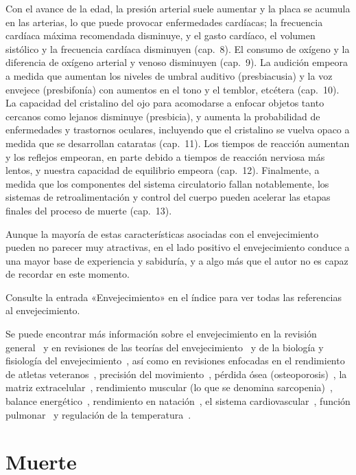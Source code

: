 \documentclass[12pt,a4paper]{book}
\begin{document}
Con el avance de la edad, la presión arterial suele aumentar y la placa se acumula en las arterias, lo que puede provocar enfermedades cardíacas; la frecuencia cardíaca máxima recomendada disminuye, y el gasto cardíaco, el volumen sistólico y la frecuencia cardíaca disminuyen (cap.~8). El consumo de oxígeno y la diferencia de oxígeno arterial y venoso disminuyen (cap.~9). La audición empeora a medida que aumentan los niveles de umbral auditivo (presbiacusia) y la voz envejece (presbifonía) con aumentos en el tono y el temblor, etcétera (cap.~10). La capacidad del cristalino del ojo para acomodarse a enfocar objetos tanto cercanos como lejanos disminuye (presbicia), y aumenta la probabilidad de enfermedades y trastornos oculares, incluyendo que el cristalino se vuelva opaco a medida que se desarrollan cataratas (cap.~11). Los tiempos de reacción aumentan y los reflejos empeoran, en parte debido a tiempos de reacción nerviosa más lentos, y nuestra capacidad de equilibrio empeora (cap.~12). Finalmente, a medida que los componentes del sistema circulatorio fallan notablemente, los sistemas de retroalimentación y control del cuerpo pueden acelerar las etapas finales del proceso de muerte (cap.~13).

Aunque la mayoría de estas características asociadas con el envejecimiento pueden no parecer muy atractivas, en el lado positivo el envejecimiento conduce a una mayor base de experiencia y sabiduría, y a algo más que el autor no es capaz de recordar en este momento.

Consulte la entrada «Envejecimiento» en el índice para ver todas las referencias al envejecimiento.

Se puede encontrar más información sobre el envejecimiento en la revisión general~\cite{f8} y en revisiones de las teorías del envejecimiento~\cite{f16} y de la biología y fisiología del envejecimiento~\cite{f1, f11}, así como en revisiones enfocadas en el rendimiento de atletas veteranos~\cite{f13, f14}, precisión del movimiento~\cite{f2}, pérdida ósea (osteoporosis)~\cite{f9}, la matriz extracelular~\cite{f12}, rendimiento muscular (lo que se denomina sarcopenia)~\cite{f3}, balance energético~\cite{f17}, rendimiento en natación~\cite{f4}, el sistema cardiovascular~\cite{f5}, función pulmonar~\cite{f10, f15} y regulación de la temperatura~\cite{f6}.

\section{Muerte}
\label{sec:f5}
\end{document}
